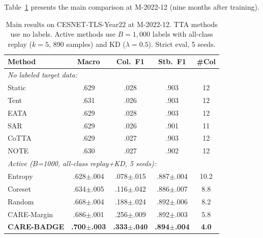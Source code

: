 \documentclass[journal]{IEEEtran}
\newcommand{\ours}{CARE}  %
\begin{document}
Table~\ref{tab:main_results} presents the main comparison at M-2022-12 (nine months after training).

\begin{table}[t]
\centering
\caption{Main results on CESNET-TLS-Year22 at M-2022-12. TTA methods use no labels. Active methods use $B{=}1{,}000$ labels with all-class replay ($k{=}5$, 890 samples) and KD ($\lambda{=}0.5$). Strict eval, 5 seeds.}
\label{tab:main_results}
\scriptsize
\setlength{\tabcolsep}{3pt}
\begin{tabular}{@{}l cccc@{}}
\toprule
Method & Macro & Col.\ F1 & Stb.\ F1 & \#Col \\
\midrule
\multicolumn{5}{l}{\textit{No labeled target data:}} \\
Static          & .629 & .028 & .903 & 12 \\
Tent            & .631 & .026 & .903 & 12 \\
EATA            & .629 & .028 & .903 & 12 \\
SAR             & .629 & .026 & .901 & 11 \\
CoTTA           & .629 & .027 & .903 & 12 \\
NOTE            & .630 & .027 & .902 & 12 \\
\midrule
\multicolumn{5}{l}{\textit{Active ($B$=1000, all-class replay+KD, 5 seeds):}} \\
Entropy         & .628$\pm$.004 & .078$\pm$.015 & .887$\pm$.004 & 10.2 \\
Coreset         & .634$\pm$.005 & .116$\pm$.042 & .886$\pm$.007 & 8.8 \\
Random          & .668$\pm$.004 & .188$\pm$.024 & .892$\pm$.006 & 8.2 \\
\ours{}-Margin  & .686$\pm$.001 & .256$\pm$.009 & .892$\pm$.003 & 5.8 \\
\textbf{\ours{}-BADGE} & \textbf{.700$\pm$.003} & \textbf{.333$\pm$.040} & \textbf{.894$\pm$.004} & \textbf{4.0} \\
\bottomrule
\end{tabular}
\end{table}
\end{document}
